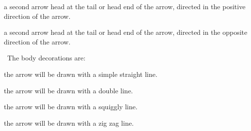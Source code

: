 \item \type{"]"} a second arrow head at the tail or head 
end of the arrow, directed in the positive direction of the arrow. 

\item \type{"["} a second arrow head at the tail or head 
end of the arrow, directed in the opposite direction of the arrow. 

\stopitemize

\noindent\ The body decorations are:

\startitemize

\item {} the arrow will be drawn with a simple straight line.

\item {} the arrow will be drawn with a double  
line. 

\item {} the arrow will be drawn with a squiggly line.

\item {} the arrow will be drawn with a zig zag line.

\stopitemize

\stopchapter 